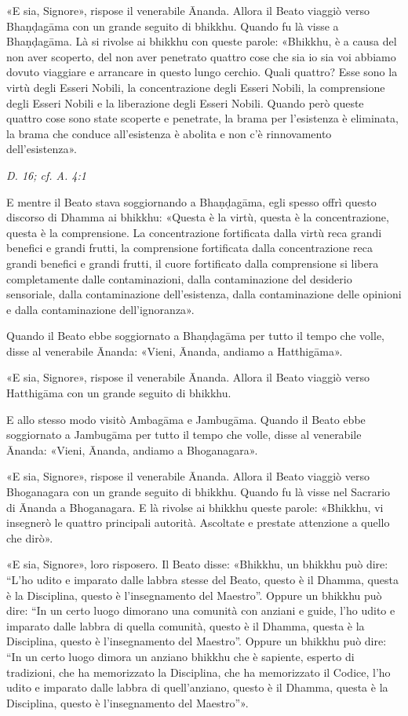 «E sia, Signore», rispose il venerabile Ānanda. Allora il Beato viaggiò
verso Bhaṇḍagāma con un grande seguito di bhikkhu. Quando fu là visse a
Bhaṇḍagāma. Là si rivolse ai bhikkhu con queste parole: «Bhikkhu, è a
causa del non aver scoperto, del non aver penetrato quattro cose che sia
io sia voi abbiamo dovuto viaggiare e arrancare in questo lungo cerchio.
Quali quattro? Esse sono la virtù degli Esseri Nobili, la concentrazione
degli Esseri Nobili, la comprensione degli Esseri Nobili e la
liberazione degli Esseri Nobili. Quando però queste quattro cose sono
state scoperte e penetrate, la brama per l’esistenza è eliminata, la
brama che conduce all’esistenza è abolita e non c’è rinnovamento
dell’esistenza».


\emph{D. 16; cf. A. 4:1}


E mentre il Beato stava soggiornando a Bhaṇḍagāma, egli spesso offrì
questo discorso di Dhamma ai bhikkhu: «Questa è la virtù, questa è la
concentrazione, questa è la comprensione. La concentrazione fortificata
dalla virtù reca grandi benefici e grandi frutti, la comprensione
fortificata dalla concentrazione reca grandi benefici e grandi frutti,
il cuore fortificato dalla comprensione si libera completamente dalle
contaminazioni, dalla contaminazione del desiderio sensoriale, dalla
contaminazione dell’esistenza, dalla contaminazione delle opinioni e
dalla contaminazione dell’ignoranza».


Quando il Beato ebbe soggiornato a Bhaṇḍagāma per tutto il tempo che
volle, disse al venerabile Ānanda: «Vieni, Ānanda, andiamo a
Hatthigāma».


«E sia, Signore», rispose il venerabile Ānanda. Allora il Beato viaggiò
verso Hatthigāma con un grande seguito di bhikkhu.


E allo stesso modo visitò Ambagāma e Jambugāma. Quando il Beato ebbe
soggiornato a Jambugāma per tutto il tempo che volle, disse al
venerabile Ānanda: «Vieni, Ānanda, andiamo a Bhoganagara».


«E sia, Signore», rispose il venerabile Ānanda. Allora il Beato viaggiò
verso Bhoganagara con un grande seguito di bhikkhu. Quando fu là visse
nel Sacrario di Ānanda a Bhoganagara. E là rivolse ai bhikkhu queste
parole: «Bhikkhu, vi insegnerò le quattro principali autorità. Ascoltate
e prestate attenzione a quello che dirò».


«E sia, Signore», loro risposero. Il Beato disse: «Bhikkhu, un bhikkhu
può dire: “L’ho udito e imparato dalle labbra stesse del Beato, questo è
il Dhamma, questa è la Disciplina, questo è l’insegnamento del Maestro”.
Oppure un bhikkhu può dire: “In un certo luogo dimorano una comunità con
anziani e guide, l’ho udito e imparato dalle labbra di quella comunità,
questo è il Dhamma, questa è la Disciplina, questo è l’insegnamento del
Maestro”. Oppure un bhikkhu può dire: “In un certo luogo dimora un
anziano bhikkhu che è sapiente, esperto di tradizioni, che ha
memorizzato la Disciplina, che ha memorizzato il Codice, l’ho udito e
imparato dalle labbra di quell’anziano, questo è il Dhamma, questa è la
Disciplina, questo è l’insegnamento del Maestro”».


